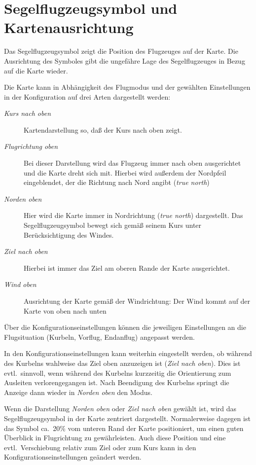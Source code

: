 \section{Segelflugzeugsymbol und Kartenausrichtung}\label{Segelflugzeugsymbol}

Das Segelflugzeugsymbol zeigt die Position des Flugzeuges auf der Karte. Die Ausrichtung des Symboles gibt die ungefähre Lage des Segelflugzeuges in Bezug auf die Karte wieder.

Die Karte kann in Abhängigkeit des Flugmodus und der gewählten Einstellungen in der Konfiguration auf drei Arten dargestellt werden:

\begin{description}
\item[\emph{Kurs nach oben}]Kartendarstellung so, daß der Kurs nach oben zeigt.
\item[\emph{Flugrichtung oben}] Bei dieser Darstellung wird das Flugzeug immer nach oben ausgerichtet und die Karte dreht sich  mit. Hierbei wird außerdem der Nordpfeil eingeblendet, der die Richtung nach Nord angibt (\emph{true north})
\item[\emph{Norden oben}] Hier wird die Karte immer in Nordrichtung (\emph{true north}) dargestellt. Das Segelflugzeugsymbol bewegt sich gemäß seinem Kurs unter Berücksichtigung des Windes.
\item[\emph{Ziel nach oben}] Hierbei ist immer das Ziel am oberen Rande der Karte ausgerichtet.
\item[\emph{Wind oben}] Ausrichtung der Karte gemäß der Windrichtung: Der Wind kommt auf der Karte von oben nach unten
\end{description}

Über die Konfigurationseinstellungen  können die jeweiligen Einstellungen an die Flugsituation (Kurbeln, Vorflug, Endanflug) angepasst werden.

In den Konfigurationseinstellungen kann weiterhin eingestellt werden, ob während des Kurbelns wahlweise das Ziel oben anzuzeigen ist (\emph{Ziel nach oben}). Dies ist evtl.\ sinnvoll, wenn während des Kurbelns kurzzeitig die Orientierung zum Ausleiten verlorengegangen ist. Nach Beendigung des Kurbelns springt die Anzeige dann wieder in \emph{Norden oben} den Modus.

Wenn die Darstellung \emph{Norden oben} oder \emph{Ziel nach oben} gewählt ist, wird das Segelflugzeugsymbol in der Karte zentriert dargestellt. Normalerweise dagegen ist das Symbol ca.\ 20\% vom unteren Rand der Karte positioniert, um einen guten Überblick in Flugrichtung zu gewährleisten. Auch diese Position und eine evtl.\ Verschiebung relativ zum Ziel oder zum Kurs kann in den Konfigurationseinstellungen geändert werden.
